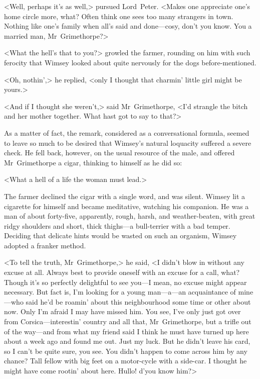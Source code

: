 <Well, perhaps it's as well,> pursued Lord~Peter. <Makes one appreciate one's home circle more, what? Often think one sees too many strangers in town. Nothing like one's family when all's said and done—cosy, don't you know. You a married man, Mr~Grimethorpe?>

<What the hell's that to you?> growled the farmer, rounding on him with such ferocity that Wimsey looked about quite nervously for the dogs before-mentioned.

<Oh, nothin',> he replied, <only I thought that charmin' little girl might be yours.>

<And if I thought she weren't,> said Mr~Grimethorpe, <I'd strangle the bitch and her mother together. What hast got to say to that?>

As a matter of fact, the remark, considered as a conversational formula, seemed to leave so much to be desired that Wimsey's natural loquacity suffered a severe check. He fell back, however, on the usual resource of the male, and offered Mr~Grimethorpe a cigar, thinking to himself as he did so:

<What a hell of a life the woman must lead.>

The farmer declined the cigar with a single word, and was silent.  Wimsey lit a cigarette for himself and became meditative, watching his companion. He was a man of about forty-five, apparently, rough, harsh, and weather-beaten, with great ridgy shoulders and short, thick thighs—a bull-terrier with a bad temper. Deciding that delicate hints would be wasted on such an organism, Wimsey adopted a franker method.

<To tell the truth, Mr~Grimethorpe,> he said, <I didn't blow in without any excuse at all. Always best to provide oneself with an excuse for a call, what? Though it's so perfectly delightful to see you—I mean, no excuse might appear necessary. But fact is, I'm looking for a young man—a—an acquaintance of mine—who said he'd be roamin' about this neighbourhood some time or other about now. Only I'm afraid I may have missed him. You see, I've only just got over from Corsica—interestin' country and all that, Mr~Grimethorpe, but a trifle out of the way—and from what my friend said I think he must have turned up here about a week ago and found me out. Just my luck.  But he didn't leave his card, so I can't be quite sure, you see. You didn't happen to come across him by any chance? Tall fellow with big feet on a motor-cycle with a side-car. I thought he might have come rootin' about here. Hullo! d'you know him?>

